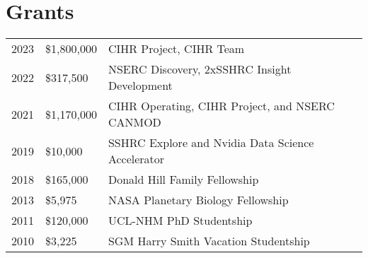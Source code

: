 \documentclass[]{Finlay_Maguire_CV}
\begin{document}
\begin{minipage}[t]{0.66\textwidth}
    \vspace{-0.3cm}

%
\sectionsep
\section{Grants} 
\begin{tabular}{rll}
2023 & \$1,800,000 & CIHR Project, CIHR Team\\
2022 & \$317,500 & NSERC Discovery, 2xSSHRC Insight Development\\
2021 & \$1,170,000 & CIHR Operating, CIHR Project, and NSERC CANMOD\\
2019 & \$10,000 & SSHRC Explore and Nvidia Data Science Accelerator\\
2018 & \$165,000 & Donald Hill Family Fellowship \\
2013 & \$5,975 & NASA Planetary Biology Fellowship \\
2011 & \$120,000 & UCL-NHM PhD Studentship\\
2010 & \$3,225 & SGM Harry Smith Vacation Studentship\\
\end{tabular}


\end{minipage}
\end{document}
